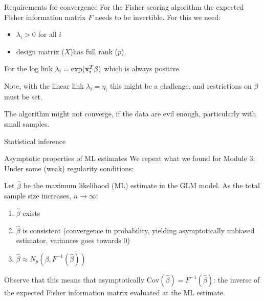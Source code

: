 \documentclass[
  ignorenonframetext,
]{beamer}
\providecommand{\tightlist}{%
  \setlength{\itemsep}{0pt}\setlength{\parskip}{0pt}}
\begin{document}
\begin{frame}
\begin{block}{Requirements for convergence}
\label{requirements-for-convergence}
For the Fisher scoring algorithm the expected Fisher information matrix
\(F\) needs to be invertible. For this we need:

\begin{itemize}
\tightlist
\item
  \(\lambda_i>0\) for all \(i\)
\item
  design matrix (\(X\))has full rank (\(p\)).
\end{itemize}

For the log link \(\lambda_i=\exp({\bf x}_i^T\beta)\) which is always
positive.

Note, with the linear link \(\lambda_i=\eta_i\) this might be a
challenge, and restrictions on \(\beta\) must be set.

The algorithm might not converge, if the data are evil enough,
particularly with small samples.
\end{block}
\end{frame}

\begin{frame}{Statistical inference}
\label{statistical-inference}
\begin{block}{Asymptotic properties of ML estimates}
\label{asymptotic-properties-of-ml-estimates}
We repeat what we found for Module 3: Under some (weak) regularity
conditions:

Let \(\hat{\beta}\) be the maximum likelihood (ML) estimate in the GLM
model. As the total sample size increases, \(n\rightarrow \infty\):

\begin{enumerate}
\tightlist
\item
  \(\hat{\beta}\) exists
\item
  \(\hat{\beta}\) is consistent (convergence in probability, yielding
  asymptotically unbiased estimator, variances goes towards 0)
\item
  \(\hat{\beta} \approx N_p(\beta,F^{-1}(\hat{\beta}))\)
\end{enumerate}

Observe that this means that asymptotically
\(\text{Cov}(\hat{\beta})=F^{-1}(\hat{\beta})\): the inverse of the
expected Fisher information matrix evaluated at the ML estimate.
\end{block}
\end{frame}
\end{document}
